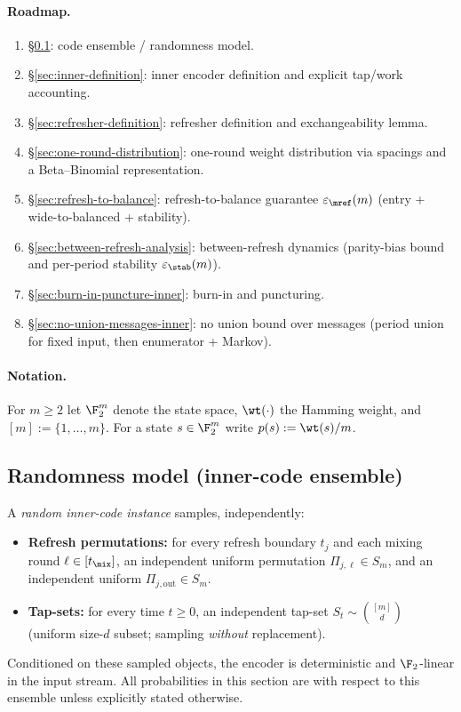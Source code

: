 \paragraph{Roadmap.}
\begin{enumerate}
\item \S\ref{sec:inner-randomness-model}: code ensemble / randomness model.
\item \S\ref{sec:inner-definition}: inner encoder definition and explicit tap/work accounting.
\item \S\ref{sec:refresher-definition}: refresher definition and exchangeability lemma.
\item \S\ref{sec:one-round-distribution}: one-round weight distribution via spacings and a Beta--Binomial representation.
\item \S\ref{sec:refresh-to-balance}: refresh-to-balance guarantee \(\varepsilon_{\mref}(m)\) (entry + wide-to-balanced + stability).
\item \S\ref{sec:between-refresh-analysis}: between-refresh dynamics (parity-bias bound and per-period stability \(\varepsilon_{\stab}(m)\)).
\item \S\ref{sec:burn-in-puncture-inner}: burn-in and puncturing.
\item \S\ref{sec:no-union-messages-inner}: no union bound over messages (period union for fixed input, then enumerator + Markov).
\end{enumerate}

\paragraph{Notation.}
For \(m\ge 2\) let \(\F_2^m\) denote the state space, \(\wt(\cdot)\) the Hamming weight,
and \([m]:=\{1,\dots,m\}\). For a state \(s\in\F_2^m\) write \(p(s):=\wt(s)/m\).

\subsection{Randomness model (inner-code ensemble)}
\label{sec:inner-randomness-model}

A \emph{random inner-code instance} samples, independently:
\begin{itemize}
\item \textbf{Refresh permutations:} for every refresh boundary \(t_j\) and each mixing round \(\ell\in[t_{\mix}]\),
an independent uniform permutation \(\Pi_{j,\ell}\in S_m\), and an independent uniform \(\Pi_{j,\mathrm{out}}\in S_m\).
\item \textbf{Tap-sets:} for every time \(t\ge 0\), an independent tap-set \(S_t\sim \binom{[m]}{d}\)
(uniform size-\(d\) subset; sampling \emph{without} replacement).
\end{itemize}
Conditioned on these sampled objects, the encoder is deterministic and \(\F_2\)-linear in the input stream.
All probabilities in this section are with respect to this ensemble unless explicitly stated otherwise.

